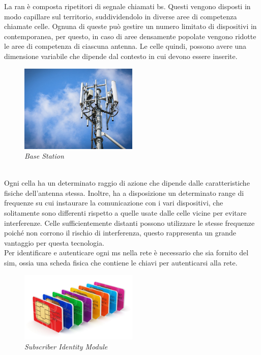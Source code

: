 \noindent La \gls{ran} è composta ripetitori di segnale chiamati \gls{bs}. 
Questi vengono disposti in modo capillare sul territorio, suddividendolo in diverse aree di competenza chiamate celle. Ognuna di queste può gestire
un numero limitato di dispositivi in contemporanea, per questo, in caso di aree densamente popolate vengono 
ridotte le aree di competenza di ciascuna antenna. Le celle quindi, possono avere una dimensione variabile che dipende dal contesto in cui devono essere inserite.
\begin{figure}[h]
    \centering
    \includegraphics[width=0.5\textwidth]{images/base-station.jpg}
    \caption{\textit{Base Station}}
\end{figure}\\
Ogni cella ha un determinato raggio di azione che dipende dalle caratteristiche fisiche dell'antenna stessa. Inoltre, 
ha a disposizione un determinato range di frequenze su cui instaurare la comunicazione con i vari dispositivi, che solitamente
sono differenti rispetto a quelle usate dalle celle vicine per evitare interferenze.
Celle sufficientemente distanti possono utilizzare le stesse frequenze poiché non corrono il rischio di interferenza, questo rappresenta
un grande vantaggio per questa tecnologia.\\

\noindent Per identificare e autenticare ogni \gls{ms} nella rete è necessario che sia fornito del \gls{sim}, ossia una scheda fisica 
che contiene le chiavi per autenticarsi alla rete.
\begin{figure}[h]
    \centering
    \includegraphics[width=0.5\textwidth]{images/simcard.jpg}
    \caption{\textit{Subscriber Identity Module}}
\end{figure}

